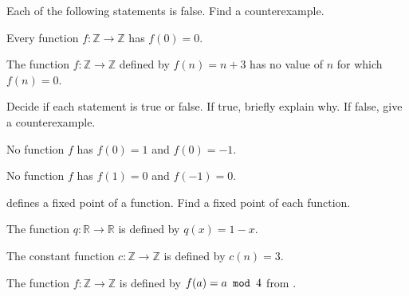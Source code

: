 \begin{exer}[\exerU] %
\label{exer_fn_cex}
    Each of the following statements is false.  Find a counterexample.
        \begin{exerpart}
            \item Every function $f: \mathbb{Z} \to \mathbb{Z}$ has $f(0)=0$.
            \item The function $f: \mathbb{Z} \to \mathbb{Z}$ defined by $f(n)=n+3$ has no value of $n$ for which $f(n) = 0$. 
        \end{exerpart}          
\end{exer}

\begin{exer} [\exerU] %
\label{exer_TorF_no_fn}
    Decide if each statement is true or false.  If true, briefly explain why.  If false, give a counterexample.
    \begin{exerpart}
        \item \label{part_no_fn_true} No function $f$ has $f(0)=1$ and $f(0)=-1$. 
        \item \label{part_no_fn_false} No function $f$ has $f(1)=0$ and $f(-1)=0$. 
    \end{exerpart}    
\end{exer}

\begin{exer}[\exerU] %
\label{exer_fixed_points_RZ}
     defines a fixed point of a function.  Find a fixed point of each function.
        \begin{exerpart}
            \item The function $q: \mathbb{R} \to \mathbb{R}$ is defined by $q(x) = 1-x$. 
            \item The constant function $c: \mathbb{Z} \to \mathbb{Z}$ is defined by $c(n) = 3$.  
            \item The function $f: \mathbb{Z} \to \mathbb{Z}$ is defined by $f(a) = a \texttt{ mod } 4$ from .
        \end{exerpart} 
\end{exer}

